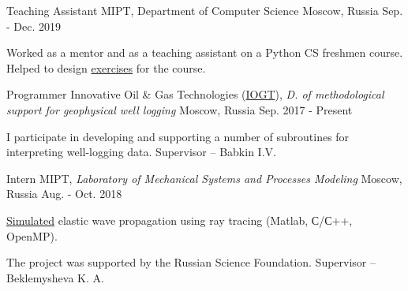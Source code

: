 \begin{cventries}

  \cventry
    {Teaching Assistant} %
    {MIPT, \hspace{5pt} Department of Computer Science} %
    {Moscow, Russia} %
    {Sep. - Dec. 2019} %
    {
      \begin{cvitems} %
        \item {Worked as a mentor and as a teaching assistant on a Python CS freshmen course. Helped to design \href{http://cs.mipt.ru/python}{exercises} for the course.}
      \end{cvitems}
    }
    

  \cventry
    {Programmer} %
    {Innovative Oil \& Gas Technologies (\href{http://www.iogt.ru/eng/}{IOGT}), \textit{D. of methodological support for geophysical well logging}} %
    {Moscow, Russia} %
    {Sep. 2017 - Present} %
    {
      \begin{cvitems} %
        \item {I participate in developing and supporting a number of subroutines for interpreting well-logging data. Supervisor -- Babkin I.V.}
      \end{cvitems}
    }


  \cventry
    {Intern} %
    {MIPT, \hspace{5pt} \textit{Laboratory of Mechanical Systems and Processes Modeling}} %
    {Moscow, Russia} %
    {Aug. - Oct. 2018} %
    {
      \begin{cvitems} %
        \item {\href{https://github.com/PolyachenkoYA/geo}{Simulated} elastic wave propagation using ray tracing (Matlab, С/С++, OpenMP).}
        \item {The project was supported by the Russian Science Foundation. Supervisor -- Beklemysheva K. A.}
      \end{cvitems}
    }

\end{cventries}
